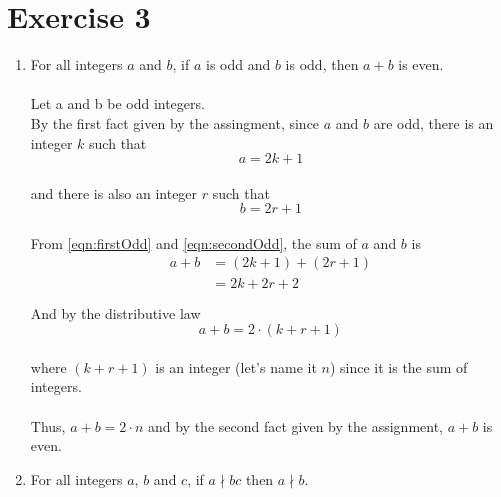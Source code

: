 \documentclass[a4paper,11pt]{article}
\begin{document}
\section*{Exercise 3}
\begin{enumerate}
    \item For all integers $a$ and $b$, if $a$ is odd and $b$ is odd, then $a + b$ is even. \\\\
        Let a and b be odd integers. \\
        By the first fact given by the assingment, since $a$ and $b$ are odd, there is an integer $k$ such that
        \begin{equation} \label{eqn:firstOdd}
            a = 2k + 1
        \end{equation} \\
        and there is also an integer $r$ such that 
        \begin{equation} \label{eqn:secondOdd}
            b = 2r + 1
        \end{equation} \\
        From \eqref{eqn:firstOdd} and \eqref{eqn:secondOdd}, the sum of $a$ and $b$ is\\
        \begin{equation*}
        \begin{split}
        a + b &= (2k + 1) + (2r + 1)\\
         & = 2k + 2r + 2 \\\\
        \end{split}
        \end{equation*}
        And by the distributive law
        \begin{equation*}
        a + b = 2 \cdot (k + r + 1)
        \end{equation*} \\
        where $(k + r + 1)$ is an integer (let's name it $n$) since it is the sum of integers. \\\\
        Thus, $a + b = 2 \cdot n$ and by the second fact given by the assignment, $a + b$ is even.
    \item For all integers $a$, $b$ and $c$, if $a \nmid bc$ then $a \nmid b$. \\\\

\end{enumerate}
\end{document}
